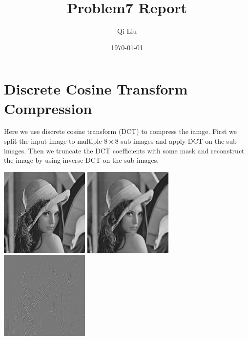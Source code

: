 \documentclass{article}
\title{Problem7 Report}
\author{Qi Liu}
\date{\today}
\begin{document}
\maketitle

\section{Discrete Cosine Transform Compression}
Here we use discrete cosine transform (DCT) to compress the iamge. First we split the input image to multiple $8\times 8$ sub-images and apply DCT on the sub-images. Then we truncate the DCT coefficients with some mask and reconstruct the image by using inverse DCT on the sub-images. 

\includegraphics[width=0.33\textwidth]{../data/lenna.jpg}
\includegraphics[width=0.33\textwidth]{../data/zonal_1_lenna.jpg}
\includegraphics[width=0.33\textwidth]{../data/delta_zonal_1_lenna.jpg}
\end{document}
